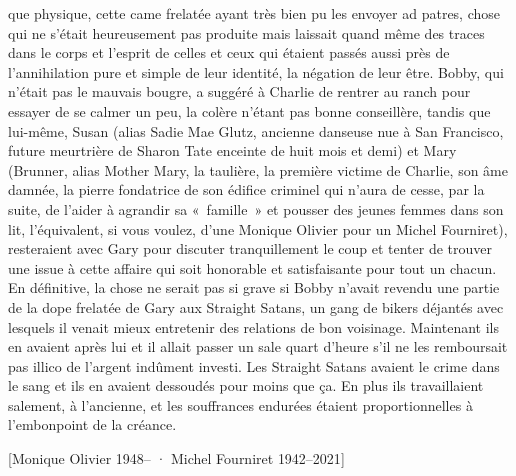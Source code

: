que physique, cette came frelatée ayant très bien pu les envoyer ad patres, chose qui ne s’était heureusement pas produite mais laissait quand même des traces dans le corps et l’esprit de celles et ceux qui étaient passés aussi près de l’annihilation pure et simple de leur identité, la négation de leur être. Bobby, qui n’était pas le mauvais bougre, a suggéré à Charlie de rentrer au ranch pour essayer de se calmer un peu, la colère n’étant pas bonne conseillère, tandis que lui-même, Susan (alias Sadie Mae Glutz, ancienne danseuse nue à San Francisco, future meurtrière de Sharon Tate enceinte de huit mois et demi) et Mary (Brunner, alias Mother Mary, la taulière, la première victime de Charlie, son âme damnée, la pierre fondatrice de son édifice criminel qui n’aura de cesse, par la suite, de l’aider à agrandir sa «~famille~» et pousser des jeunes femmes dans son lit, l’équivalent, si vous voulez, d’une Monique Olivier pour un Michel Fourniret), resteraient avec Gary pour discuter tranquillement le coup et tenter de trouver une issue à cette affaire qui soit honorable et satisfaisante pour tout un chacun. En définitive, la chose ne serait pas si grave si Bobby n’avait revendu une partie de la dope frelatée de Gary aux Straight Satans, un gang de bikers déjantés avec lesquels il venait mieux entretenir des relations de bon voisinage. Maintenant ils en avaient après lui et il allait passer un sale quart d’heure s’il ne les remboursait pas illico de l’argent indûment investi. Les Straight Satans avaient le crime dans le sang et ils en avaient dessoudés pour moins que ça. En plus ils travaillaient salement, à l’ancienne, et les souffrances endurées étaient proportionnelles à l’embonpoint de la créance.

%
%
[Monique Olivier \textup{1948--} · Michel Fourniret \textup{1942--2021}]

